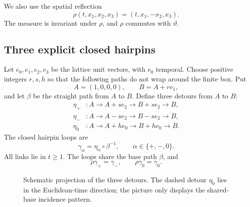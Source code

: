 \documentclass[11pt]{article}
\begin{document}
We also use the spatial reflection
\begin{equation}
  \rho(t,x_1,x_2,x_3)=(t,x_1,-x_2,x_3).
  \label{eq:rho}
\end{equation}
The measure is invariant under $\rho$, and $\rho$ commutes with $\vartheta$.

\subsection{Three explicit closed hairpins}
\label{sec:hairpin-geometry}

Let $e_0,e_1,e_2,e_3$ be the lattice unit vectors, with $e_0$ temporal.  Choose positive integers $r,s,h$ so that the following paths do not wrap around the finite box.  Put
\[
  A=(1,0,0,0),
  \qquad
  B=A+re_1,
\]
and let $\beta$ be the straight path from $A$ to $B$.  Define three detours from $A$ to $B$:
\begin{align}
  \eta_+&:
  A\longrightarrow A+se_2
  \longrightarrow B+se_2
  \longrightarrow B,
  \label{eq:eta-plus}\\
  \eta_-&:
  A\longrightarrow A-se_2
  \longrightarrow B-se_2
  \longrightarrow B,
  \label{eq:eta-minus}\\
  \eta_0&:
  A\longrightarrow A+he_0
  \longrightarrow B+he_0
  \longrightarrow B.
  \label{eq:eta-zero}
\end{align}
The closed hairpin loops are
\begin{equation}
  \gamma_\alpha=\eta_\alpha\circ\beta^{-1},
  \qquad \alpha\in\{+,-,0\}.
  \label{eq:gamma-hairpins}
\end{equation}
All links lie in $t\ge1$.  The loops share the base path $\beta$, and
\begin{equation}
  \rho\gamma_+=\gamma_-,
  \qquad
  \rho\gamma_0=\gamma_0.
  \label{eq:rho-loops}
\end{equation}

\begin{figure}[t]
\centering
{}
\caption{Schematic projection of the three detours.  The dashed detour $\eta_0$ lies in the Euclidean-time direction; the picture only displays the shared-base incidence pattern.}
\label{fig:hairpins}
\end{figure}
\end{document}
